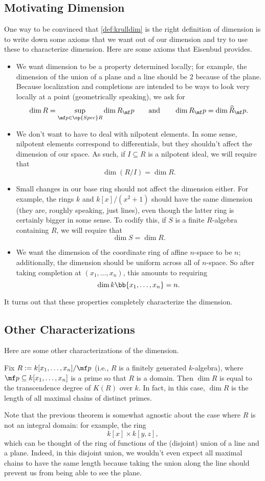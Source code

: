 \subsection{Motivating Dimension}
One way to be convinced that \autoref{def:krulldim} is the right definition of dimension is to write down some axioms that we want out of our dimension and try to use these to characterize dimension. Here are some axioms that Eisenbud provides.
\begin{itemize}
	\item We want dimension to be a property determined locally; for example, the dimension of the union of a plane and a line should be $2$ because of the plane. Because localization and completions are intended to be ways to look very locally at a point (geometrically speaking), we ask for
	\[\dim R=\sup_{\mf p\in\op{Spec}R}\dim R_\mf p\qquad\text{and}\qquad\dim R_\mf p=\dim\widehat R_\mf p.\]
	\item We don't want to have to deal with nilpotent elements. In some sense, nilpotent elements correspond to differentials, but they shouldn't affect the dimension of our space. As such, if $I\subseteq R$ is a nilpotent ideal, we will require that
	\[\dim(R/I)=\dim R.\]
	\item Small changes in our base ring should not affect the dimension either. For example, the rings $k$ and $k[x]/\left(x^2+1\right)$ should have the same dimension (they are, roughly speaking, just lines), even though the latter ring is certainly bigger in some sense. To codify this, if $S$ is a finite $R$-algebra containing $R$, we will require that
	\[\dim S=\dim R.\]
	\item We want the dimension of the coordinate ring of affine $n$-space to be $n$; additionally, the dimension should be uniform across all of $n$-space. So after taking completion at $(x_1,\ldots,x_n)$, this amounts to requiring
	\[\dim k\bb{x_1,\ldots,x_n}=n.\]
\end{itemize}
It turns out that these properties completely characterize the dimension.

\subsection{Other Characterizations}
Here are some other characterizations of the dimension.
\begin{theorem}
	Fix $R:=k[x_1,\ldots,x_n]/\mf p$ (i.e., $R$ is a finitely generated $k$-algebra), where $\mf p\subseteq k[x_1,\ldots,x_n]$ is a prime so that $R$ is a domain. Then $\dim R$ is equal to the transcendence degree of $K(R)$ over $k$. In fact, in this case, $\dim R$ is the length of all maximal chains of distinct primes.
\end{theorem}
Note that the previous theorem is somewhat agnostic about the case where $R$ is not an integral domain: for example, the ring
\[k[x]\times k[y,z],\]
which can be thought of the ring of functions of the (disjoint) union of a line and a plane. Indeed, in this disjoint union, we wouldn't even expect all maximal chains to have the same length because taking the union along the line should prevent us from being able to see the plane.

